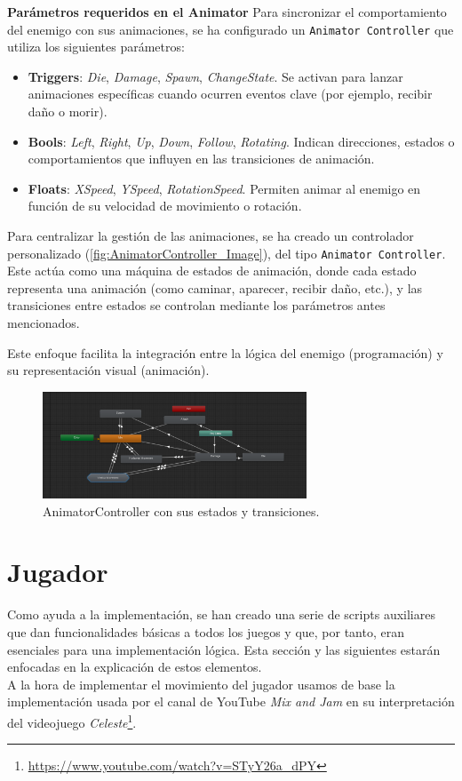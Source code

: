 \textbf{Parámetros requeridos en el Animator}
Para sincronizar el comportamiento del enemigo con sus animaciones, se ha configurado un \texttt{Animator Controller} que utiliza los siguientes parámetros:
\begin{itemize}
	\item \textbf{Triggers}: \textit{Die}, \textit{Damage}, \textit{Spawn}, \textit{ChangeState}. Se activan para lanzar animaciones específicas cuando ocurren eventos clave (por ejemplo, recibir daño o morir).
	\item \textbf{Bools}: \textit{Left}, \textit{Right}, \textit{Up}, \textit{Down}, \textit{Follow}, \textit{Rotating}. Indican direcciones, estados o comportamientos que influyen en las transiciones de animación.
	\item \textbf{Floats}: \textit{XSpeed}, \textit{YSpeed}, \textit{RotationSpeed}. Permiten animar al enemigo en función de su velocidad de movimiento o rotación.
\end{itemize}

Para centralizar la gestión de las animaciones, se ha creado un controlador personalizado (\autoref{fig:AnimatorController_Image}), del tipo \texttt{Animator Controller}. Este actúa como una máquina de estados de animación, donde cada estado representa una animación (como caminar, aparecer, recibir daño, etc.), y las transiciones entre estados se controlan mediante los parámetros antes mencionados.

Este enfoque facilita la integración entre la lógica del enemigo (programación) y su representación visual (animación).
\begin{figure}[t]
		\centering
		\includegraphics[width = 0.7\textwidth]{Imagenes/AnimatorController.png}
		\caption{AnimatorController con sus estados y transiciones.}
		\label{fig:AnimatorController_Image}
\end{figure}
\section{Jugador}

Como ayuda a la implementación, se han creado una serie de scripts auxiliares que dan funcionalidades básicas a todos los juegos y que, por tanto, eran esenciales para una implementación lógica. Esta sección y las siguientes estarán enfocadas en la explicación de estos elementos.\\
A la hora de implementar el movimiento del jugador usamos de base la implementación usada por el canal de YouTube \textit{Mix and Jam} en su interpretación del videojuego \textit{Celeste}\footnote{\url{https://www.youtube.com/watch?v=STyY26a_dPY}}.

